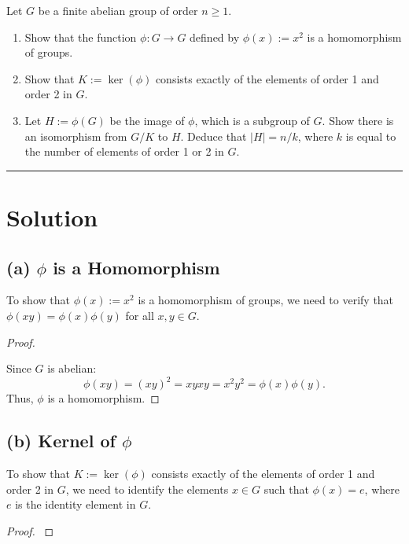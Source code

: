 \documentclass[12pt]{amsart}
\theoremstyle{definition}
\numberwithin{equation}{section}
\begin{document}
\begin{exercise}{5} Let $G$ be a finite abelian group of order \(n \geq 1\).
    \begin{enumerate}
        \item Show that the function \(\phi: G \rightarrow G\) defined by \(\phi(x):= x^2\) is a homomorphism of groups.
        \item Show that \(K:= \ker(\phi)\) consists exactly of the elements of order 1 and order 2 in $G$.
        \item Let \(H:=\phi(G)\) be the image of \(\phi\), which is a subgroup of $G$. Show there is an isomorphism from \(G/K\) to $H$. Deduce that \(|H|=n/k\), where $k$ is equal to the number of elements of order 1 or 2 in $G$.
    \end{enumerate}

    \noindent\rule{\linewidth}{1pt}

    \section*{Solution}

    \subsection*{(a) \(\phi\) is a Homomorphism}

    To show that \(\phi(x) := x^2\) is a homomorphism of groups, we need to verify that \(\phi(xy) = \phi(x) \phi(y)\) for all \(x, y \in G\).

    \begin{proof} \( \)

    Since \(G\) is abelian:
    \[
    \phi(xy) = (xy)^2 = xyxy = x^2 y^2 = \phi(x) \phi(y).
    \]
    Thus, \(\phi\) is a homomorphism.

    \end{proof}

    \subsection*{(b) Kernel of \(\phi\)}

    To show that \(K := \ker(\phi)\) consists exactly of the elements of order 1 and order 2 in \(G\), we need to identify the elements \(x \in G\) such that \(\phi(x) = e\), where \(e\) is the identity element in \(G\).

    \begin{proof} \( \)


\end{proof}
\end{exercise}
\end{document}
